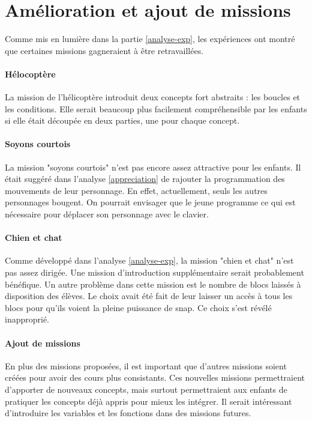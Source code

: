 \section{Amélioration et ajout de missions}
Comme mis en lumière dans la partie \ref{analyse-exp}, les expériences ont montré que certaines \glspl{mission} gagneraient à être retravaillées.

\paragraph{Hélocoptère}
La \gls{mission} de l'hélicoptère introduit deux concepts fort abstraits : les boucles et les conditions. Elle serait beaucoup plus facilement compréhensible par les enfants si elle était découpée en deux parties, une pour chaque concept.

\paragraph{Soyons courtois}
La \gls{mission} "soyons courtois" n'est pas encore assez attractive pour les enfants. Il était suggéré dans l'analyse \ref{appreciation} de rajouter la programmation des mouvements de leur personnage. En effet, actuellement, seuls les autres personnages bougent. On pourrait envisager que le jeune programme ce qui est nécessaire pour déplacer son personnage avec le clavier.

\paragraph{Chien et chat}
Comme développé dans l'analyse \ref{analyse-exp}, la \gls{mission} "chien et chat" n'est pas assez dirigée. Une \gls{mission} d'introduction supplémentaire serait probablement bénéfique. Un autre problème dans cette \gls{mission} est le nombre de \glspl{bloc}  laissés à disposition des élèves. Le choix avait été fait de leur laisser un accès à tous les \glspl{bloc}  pour qu'ils voient la pleine puissance de \gls{snap}. Ce choix s'est révélé inapproprié.

\paragraph{Ajout de missions}
En plus des \glspl{mission} proposées, il est important que d'autres \glspl{mission} soient créées pour avoir des cours plus consistants. Ces nouvelles \glspl{mission} permettraient d'apporter de nouveaux concepts, mais surtout permettraient aux enfants de pratiquer les concepts déjà appris pour mieux les intégrer. Il serait intéressant d'introduire les variables et les fonctions dans des \glspl{mission} futures.

